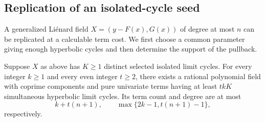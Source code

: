 \subsection{Replication of an isolated-cycle seed}\label{sec:seed-replication}
A generalized Li\'enard field \(X=(y-F(x),G(x))\) of degree at most \(n\) can be replicated at a calculable term cost. We first choose a common parameter giving enough hyperbolic cycles and then determine the support of the pullback.
\begin{proposition}\label{prop:seed-strips}
Suppose \(X\) as above has \(K\ge1\) distinct selected isolated limit cycles.
For every integer \(k\ge1\) and every even integer \(t\ge2\), there exists a rational polynomial field with coprime components and pure univariate terms having at least \(tkK\) simultaneous hyperbolic limit cycles. Its term count and degree are at most
\[
 k+t(n+1),\qquad \max\{2k-1,t(n+1)-1\},
\]
respectively.
\end{proposition}

